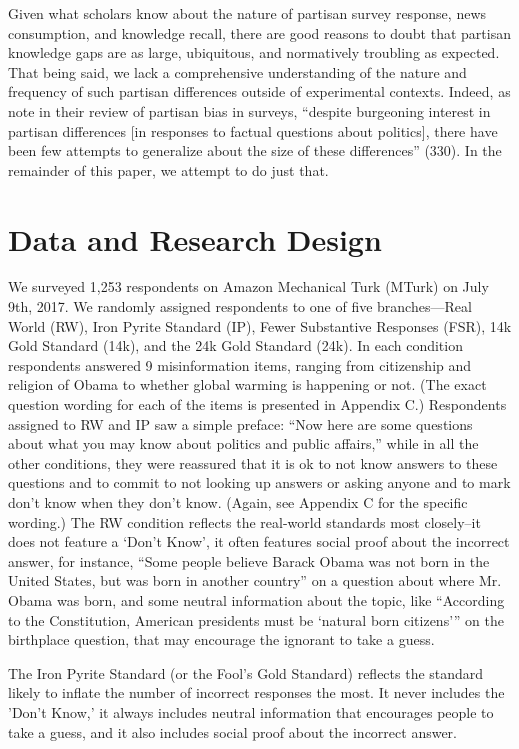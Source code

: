 \documentclass[12pt, letterpaper]{article}
\begin{document}
Given what scholars know about the nature of partisan survey response, news consumption, and knowledge recall, there are good reasons to doubt that partisan knowledge gaps are as large, ubiquitous, and normatively troubling as expected. That being said, we lack a comprehensive understanding of the nature and frequency of such partisan differences outside of experimental contexts. Indeed, as \citet{bullocklenz_2019} note in their review of partisan bias in surveys, ``despite burgeoning interest in partisan differences [in responses to factual questions about politics], there have been few attempts to generalize about the size of these differences'' (330).  In the remainder of this paper, we attempt to do just that.

\section*{Data and Research Design}\label{sec:data}

We surveyed 1,253 respondents on Amazon Mechanical Turk (MTurk) on July 9th, 2017. We randomly assigned respondents to one of five branches—Real World (RW), Iron Pyrite Standard (IP), Fewer Substantive Responses (FSR), 14k Gold Standard (14k), and the 24k Gold Standard (24k). In each condition respondents answered 9 misinformation items, ranging from citizenship and religion of Obama to whether global warming is happening or not. (The exact question wording for each of the items is presented in Appendix C.) Respondents assigned to RW and IP saw a simple preface: ``Now here are some questions about what you may know about politics and public affairs,'' while in all the other conditions, they were reassured that it is ok to not know answers to these questions and to commit to not looking up answers or asking anyone and to mark don't know when they don’t know. (Again, see Appendix C for the specific wording.)
The RW condition reflects the real-world standards most closely--it does not feature a `Don't Know', it often features social proof about the incorrect answer, for instance, ``Some people believe Barack Obama was not born in the United States, but was born in another country'' on a question about where Mr. Obama was born, and some neutral information about the topic, like ``According to the Constitution, American presidents must be `natural born citizens''' on the birthplace question, that may encourage the ignorant to take a guess.

The Iron Pyrite Standard (or the Fool's Gold Standard) reflects the standard likely to inflate the number of incorrect responses the most. It never includes the 'Don't Know,' it always includes neutral information that encourages people to take a guess, and it also includes social proof about the incorrect answer.
\end{document}
